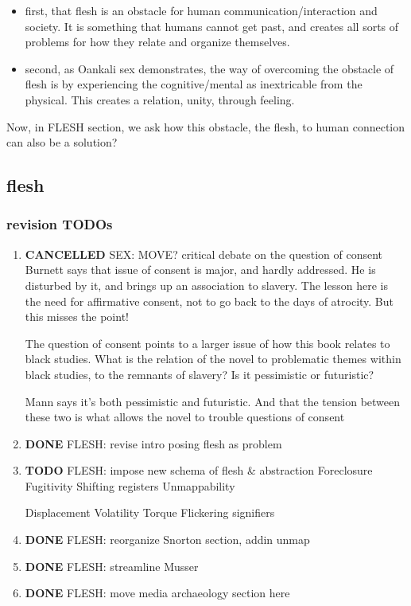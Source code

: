 \documentclass[11pt]{article}
\begin{document}
\begin{enumerate}
\begin{itemize}
\item first, that flesh is an obstacle for human communication/interaction
and society. It is something that humans cannot get past, and
creates all sorts of problems for how they relate and organize
themselves.
\item second, as Oankali sex demonstrates, the way of overcoming the
obstacle of flesh is by experiencing the cognitive/mental as
inextricable from the physical. This creates a relation, unity,
through feeling.
\end{itemize}

Now, in FLESH section, we ask how this obstacle, the flesh, to human
connection can also be a solution?
\end{enumerate}


\subsection{flesh}
\label{sec:orgbd0c33e}
\subsubsection{revision TODOs}
\label{sec:org42d5490}
\begin{enumerate}
\item {\bfseries\sffamily CANCELLED} SEX: MOVE? critical debate on the question of consent
\label{sec:org1616f98}
Burnett says that issue of consent is major, and hardly addressed. He
is disturbed by it, and brings up an association to slavery. The
lesson here is the need for affirmative consent, not to go back to the
days of atrocity. But this misses the point!

The question of consent points to a larger issue of how this book
relates to black studies. What is the relation of the novel to
problematic themes within black studies, to the remnants of slavery?
Is it pessimistic or futuristic?

Mann says it's both pessimistic and futuristic. And that the tension
between these two is what allows the novel to trouble questions of
consent

\item {\bfseries\sffamily DONE} FLESH: revise intro posing flesh as problem
\label{sec:org92ea1a6}

\item {\bfseries\sffamily TODO} FLESH: impose new schema of flesh \& abstraction
\label{sec:orgba24239}
Foreclosure
Fugitivity
Shifting registers
Unmappability

Displacement
Volatility
Torque
Flickering signifiers

\item {\bfseries\sffamily DONE} FLESH: reorganize Snorton section, addin unmap
\label{sec:org33064c6}
\item {\bfseries\sffamily DONE} FLESH: streamline Musser
\label{sec:org1e10baf}
\item {\bfseries\sffamily DONE} FLESH: move media archaeology section here
\label{sec:orgc7686fc}
\end{enumerate}
\end{document}
